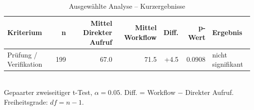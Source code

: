 \begin{table}[htbp]
\centering
\caption{Ausgewählte Analyse -- Kurzergebnisse}
\begin{tabular}{lrrrrrl}
\toprule
Kriterium & n & Mittel Direkter Aufruf & Mittel Workflow & Diff. & p-Wert & Ergebnis \\
\midrule
Prüfung / Verifikation & 199 & 67.0 & 71.5 & +4.5 & 0.0908 & nicht signifikant \\
\bottomrule
\end{tabular}
\\[2mm]
\footnotesize Gepaarter zweiseitiger t-Test, $\alpha=0.05$. Diff. = Workflow $-$ Direkter Aufruf. Freiheitsgrade: $df=n-1$.
\end{table}
